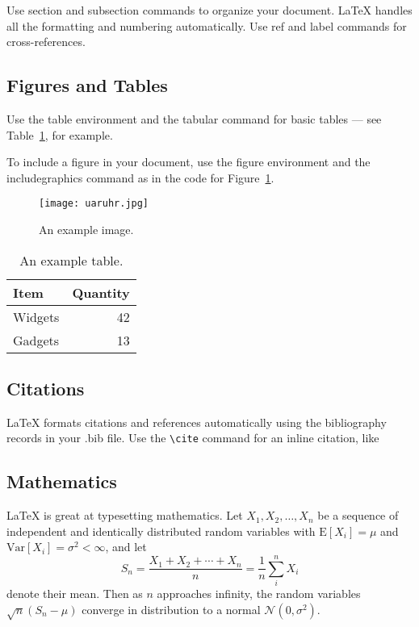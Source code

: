 \documentclass[fleqn,10pt,twoside]{gcb15submission}
\begin{document}
Use section and subsection commands to organize your document. \LaTeX{} handles all the formatting and numbering automatically. Use ref and label commands for cross-references.

\subsection*{Figures and Tables}

Use the table environment and the tabular command for basic tables --- see Table~\ref{tab:widgets}, for example.

To include a figure in your document, use the figure environment and the includegraphics command as in the code for Figure~\ref{fig:uaruhr}.

\begin{figure}[ht]\centering
\texttt{[image: uaruhr.jpg]}
\caption{An example image.}
\label{fig:uaruhr}
\end{figure}

\begin{table}[ht]
\centering
\begin{tabular}{l|r}
Item & Quantity \\\hline
Widgets & 42 \\
Gadgets & 13
\end{tabular}
\caption{\label{tab:widgets}An example table.}
\end{table}

\subsection*{Citations}

LaTeX formats citations and references automatically using the bibliography records in your .bib file.
Use the \verb|\cite| command for an inline citation, like %

\subsection*{Mathematics}

\LaTeX{} is great at typesetting mathematics. Let $X_1, X_2, \ldots, X_n$ be a sequence of independent and identically distributed random variables with $\text{E}[X_i] = \mu$ and $\text{Var}[X_i] = \sigma^2 < \infty$, and let
$$S_n = \frac{X_1 + X_2 + \cdots + X_n}{n}
      = \frac{1}{n}\sum_{i}^{n} X_i$$
denote their mean. Then as $n$ approaches infinity, the random variables $\sqrt{n}(S_n - \mu)$ converge in distribution to a normal $\mathcal{N}(0, \sigma^2)$.
\end{document}
